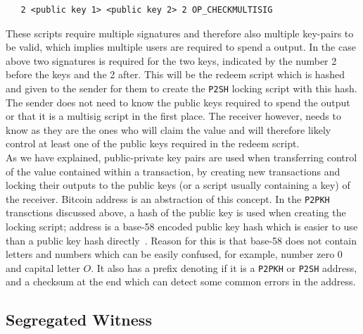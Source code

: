 \begin{verbatim}
   2 <public key 1> <public key 2> 2 OP_CHECKMULTISIG
\end{verbatim}

These scripts require multiple signatures and therefore also multiple key-pairs to be valid, which implies multiple users are required to spend a output.
In the case above two signatures is required for the two keys, indicated by the number 2 before the keys and the 2 after.
This will be the redeem script which is hashed and given to the sender for them to create the {\tt P2SH} locking script with this hash.
The sender does not need to know the public keys required to spend the output or that it is a multisig script in the first place. The receiver however, needs to know as they are the ones who will claim the value and will therefore likely control at least one of the public keys required in the redeem script.
\\

As we have explained, public-private key pairs are used when transferring  control of the value contained within a transaction, by creating new transactions and locking their outputs to the public keys (or a script usually containing a key) of the receiver. Bitcoin address is an abstraction of this concept. In the {\tt P2PKH} transctions discussed above, a hash of the public key is used when creating the locking script; address is a base-58 encoded public key hash which is easier to use than a public key hash directly~\cite{antonopoulos2017mastering}. Reason for this is that base-58 does not contain letters and numbers which can be easily confused, for example, number zero $0$ and capital letter $O$. It also has a prefix denoting if it is a {\tt P2PKH} or {\tt P2SH} address, and a checksum at the end which can detect some common errors in the address.

\subsection{Segregated Witness}
\label{subsec:segwit}

